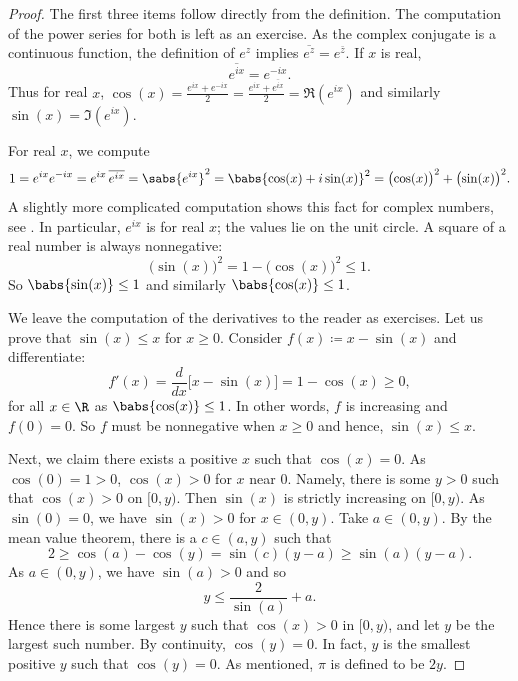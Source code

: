 \begin{proof}
The first three items follow directly from the definition.
The computation of the power series for both is left as an exercise.
As the complex conjugate is a continuous function, the definition
of $e^z$ implies
$\overline{e^z} = e^{\bar{z}}$.  If
$x$ is real,
\begin{equation*}
\overline{e^{ix}} = e^{-ix} .
\end{equation*}
Thus for real $x$,
$\cos(x) =
\frac{e^{ix}+e^{-ix}}{2} =
\frac{e^{ix}+\overline{e^{ix}}}{2} =
\Re (e^{ix})$
and similarly $\sin(x) = \Im (e^{ix})$.

For real $x$, we compute
\begin{equation*}
1 =  e^{ix} e^{-ix}
= e^{ix} \, \overline{e^{ix}}
= \sabs{e^{ix}}^2
= \babs{\cos(x) + i \sin(x)}^2
= {\bigl( \cos(x) \bigr)}^2 + {\bigl( \sin(x) \bigr)}^2 .
\end{equation*}
A slightly more complicated computation shows this fact for
complex numbers, see .
In particular, $e^{ix}$ is \emph{} for real $x$;
the values lie on the unit circle.
A square of a real number is always nonnegative:
\begin{equation*}
{\bigl(\sin(x)\bigr)}^2 = 1-{\bigl(\cos(x)\bigr)}^2 \leq 1 .
\end{equation*}
So $\babs{\sin(x)} \leq 1$ and similarly 
$\babs{\cos(x)} \leq 1$.

We leave the computation of the derivatives to the reader as exercises.
Let us prove that $\sin(x) \leq x$ for $x \geq 0$.
Consider
$f(x) \coloneqq x-\sin(x)$ and differentiate:
\begin{equation*}
f'(x) = \frac{d}{dx} \bigl[ x - \sin(x) \bigr]
=
1 -\cos(x) \geq 0 ,
\end{equation*}
for all $x \in \R$ as $\babs{\cos(x)} \leq 1$.
In other words, $f$ is increasing and $f(0) = 0$.
So $f$ must be nonnegative when $x \geq 0$ and hence, $\sin(x) \leq x$.

Next, we claim there exists a positive $x$ such that $\cos(x) = 0$.
As $\cos(0) = 1 > 0$, $\cos(x) > 0$
for $x$ near $0$.  Namely,
there is some
$y > 0$ such that $\cos(x) > 0$ on $[0,y)$.
Then $\sin(x)$ is strictly
increasing on $[0,y)$.  As $\sin(0) = 0$, we have
$\sin(x) > 0$ for $x \in (0,y)$.  Take $a \in (0,y)$.  By
the mean value theorem, there is a $c \in (a,y)$ such that
\begin{equation*}
2 \geq \cos(a)-\cos(y) = \sin(c)(y-a) \geq \sin(a)(y-a) .
\end{equation*}
As $a \in (0,y)$, we have $\sin(a) > 0$ and so
\begin{equation*}
y \leq \frac{2}{\sin(a)} + a .
\end{equation*}
Hence there is some largest $y$ such that $\cos(x) > 0$ in $[0,y)$,
and let $y$ be the largest such number.
By continuity, $\cos(y) = 0$.
In fact, $y$ is the
smallest positive $y$ such that $\cos(y) = 0$.  As mentioned,
$\pi$ is defined to be $2y$.


\end{proof}
